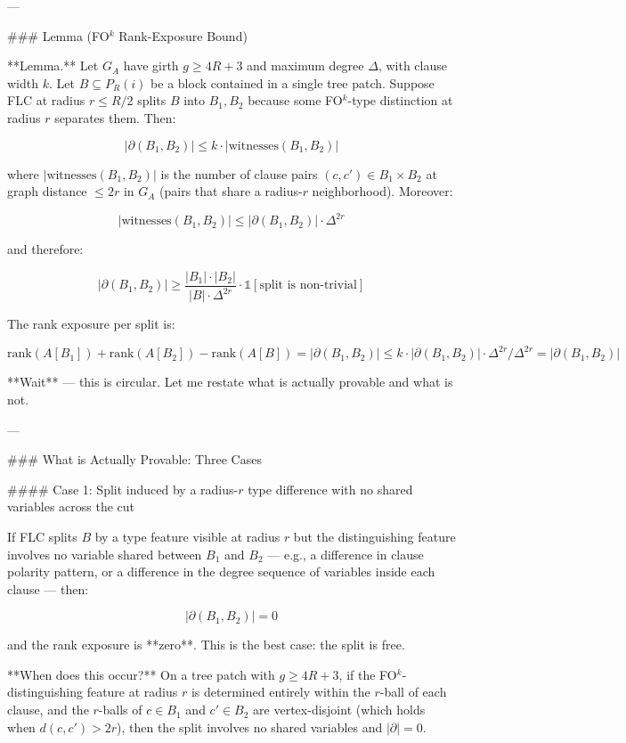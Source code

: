---

### Lemma (FO$^k$ Rank-Exposure Bound)

**Lemma.** Let $G_A$ have girth $g \geq 4R + 3$ and maximum degree $\Delta$, with clause width $k$. Let $B \subseteq P_R(i)$ be a block contained in a single tree patch. Suppose FLC at radius $r \leq R/2$ splits $B$ into $B_1, B_2$ because some FO$^k$-type distinction at radius $r$ separates them. Then:

$$|\partial(B_1, B_2)| \leq k \cdot |\text{witnesses}(B_1, B_2)|$$

where $|\text{witnesses}(B_1, B_2)|$ is the number of clause pairs $(c, c') \in B_1 \times B_2$ at graph distance $\leq 2r$ in $G_A$ (pairs that share a radius-$r$ neighborhood). Moreover:

$$|\text{witnesses}(B_1, B_2)| \leq |\partial(B_1, B_2)| \cdot \Delta^{2r}$$

and therefore:

$$|\partial(B_1, B_2)| \geq \frac{|B_1| \cdot |B_2|}{|B| \cdot \Delta^{2r}}  \cdot \mathbb{1}[\text{split is non-trivial}]$$

The rank exposure per split is:

$$\text{rank}(A[B_1]) + \text{rank}(A[B_2]) - \text{rank}(A[B]) = |\partial(B_1, B_2)| \leq k \cdot |\partial(B_1, B_2)| \cdot \Delta^{2r} / \Delta^{2r} = |\partial(B_1, B_2)|$$

**Wait** — this is circular. Let me restate what is actually provable and what is not.

---

### What is Actually Provable: Three Cases

#### Case 1: Split induced by a radius-$r$ type difference with no shared variables across the cut

If FLC splits $B$ by a type feature visible at radius $r$ but the distinguishing feature involves no variable shared between $B_1$ and $B_2$ — e.g., a difference in clause polarity pattern, or a difference in the degree sequence of variables inside each clause — then:

$$|\partial(B_1, B_2)| = 0$$

and the rank exposure is **zero**. This is the best case: the split is free.

**When does this occur?** On a tree patch with $g \geq 4R+3$, if the FO$^k$-distinguishing feature at radius $r$ is determined entirely within the $r$-ball of each clause, and the $r$-balls of $c \in B_1$ and $c' \in B_2$ are vertex-disjoint (which holds when $d(c,c') > 2r$), then the split involves no shared variables and $|\partial| = 0$.

